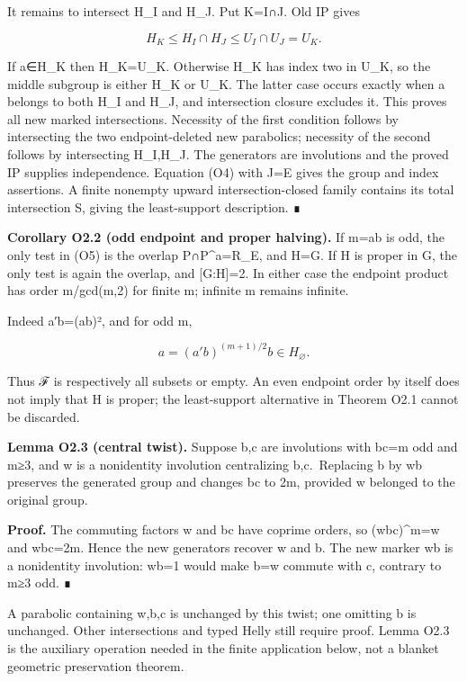 \documentclass[
  10pt,
  letterpaper,
]{article}
\newcounter{none} %
\begin{document}
It remains to intersect H\_I and H\_J. Put K=I∩J. Old IP gives

\[
H_K\le H_I\cap H_J\le U_I\cap U_J=U_K.
\tag{O7}
\]

If a∈H\_K then H\_K=U\_K. Otherwise H\_K has index two in U\_K, so the
middle subgroup is either H\_K or U\_K. The latter case occurs exactly
when a belongs to both H\_I and H\_J, and intersection closure excludes
it. This proves all new marked intersections. Necessity of the first
condition follows by intersecting the two endpoint-deleted new
parabolics; necessity of the second follows by intersecting H\_I,H\_J.
The generators are involutions and the proved IP supplies independence.
Equation (O4) with J=E gives the group and index assertions. A finite
nonempty upward intersection-closed family contains its total
intersection S, giving the least-support description. ∎

\textbf{Corollary O2.2 (odd endpoint and proper halving).} If
m=\textbar ab\textbar{} is odd, the only test in (O5) is the overlap
P∩P\^{}a=R\_E, and H=G. If H is proper in G, the only test is again the
overlap, and {[}G:H{]}=2. In either case the endpoint product has order
m/gcd(m,2) for finite m; infinite m remains infinite.

Indeed a′b=(ab)², and for odd m,

\[
a=(a'b)^{(m+1)/2}b\in H_\varnothing.
\]

Thus ℱ is respectively all subsets or empty. An even endpoint order by
itself does not imply that H is proper; the least-support alternative in
Theorem O2.1 cannot be discarded.

\textbf{Lemma O2.3 (central twist).} Suppose b,c are involutions with
\textbar bc\textbar=m odd and m≥3, and w is a nonidentity involution
centralizing b,c.~Replacing b by wb preserves the generated group and
changes \textbar bc\textbar{} to 2m, provided w belonged to the original
group.

\textbf{Proof.} The commuting factors w and bc have coprime orders, so
(wbc)\^{}m=w and \textbar wbc\textbar=2m. Hence the new generators
recover w and b. The new marker wb is a nonidentity involution: wb=1
would make b=w commute with c, contrary to m≥3 odd. ∎

A parabolic containing w,b,c is unchanged by this twist; one omitting b
is unchanged. Other intersections and typed Helly still require proof.
Lemma O2.3 is the auxiliary operation needed in the finite application
below, not a blanket geometric preservation theorem.
\end{document}
